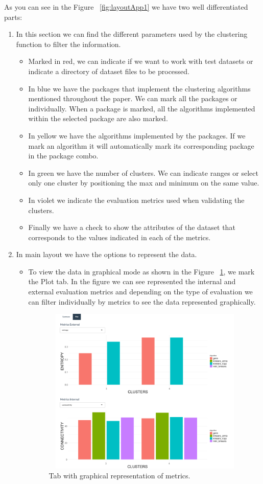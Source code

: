 As you can see in the Figure ~\ref{fig:layoutApp1} we have two well differentiated parts:
\begin{enumerate}
  \item In this section we can find the different parameters used by the clustering function to filter the information.
  \begin{itemize}
  \item Marked in red, we can indicate if we want to work with test datasets or indicate a directory of dataset files to be processed.
  \item In blue we have the packages that implement the clustering algorithms mentioned throughout the paper. We can mark all the packages or individually. When a package is marked, all the algorithms implemented within the selected package are also marked.
  \item In yellow we have the algorithms implemented by the packages. If we mark an algorithm it will automatically mark its corresponding package in the package combo.
  \item In green we have the number of clusters. We can indicate ranges or select only one cluster by positioning the max and minimum on the same value.
  \item In violet we indicate the evaluation metrics used when validating the clusters.
  \item Finally we have a check to show the attributes of the dataset that corresponds to the values indicated in each of the metrics.

\end{itemize}
  \item In main layout we have the options to represent the data.
  \begin{itemize}

    \item To view the data in graphical mode as shown in the Figure ~\ref{fig:tab_graph}, we mark the Plot tab. In the figure we can see represented the internal and external evaluation metrics and depending on the type of evaluation we can filter individually by metrics to see the data represented graphically.

  \begin{figure}[htbp]
    \centering
     \includegraphics[width=14cm, height=8cm]{img/tab_graph}
      \caption{Tab with graphical representation of metrics.}
      \label{fig:tab_graph}
  \end{figure}


\end{itemize}
\end{enumerate}
